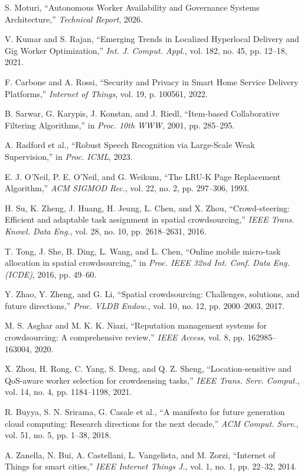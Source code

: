 \documentclass[10pt,twocolumn,a4paper]{article}
\begin{document}
{\noindent [13] S. Moturi, ``Autonomous Worker Availability and Governance Systems Architecture,'' \textit{Technical Report}, 2026.\par
\noindent [14] V. Kumar and S. Rajan, ``Emerging Trends in Localized Hyperlocal Delivery and Gig Worker Optimization,'' \textit{Int. J. Comput. Appl.}, vol. 182, no. 45, pp. 12--18, 2021.\par
\noindent [15] F. Carbone and A. Rossi, ``Security and Privacy in Smart Home Service Delivery Platforms,'' \textit{Internet of Things}, vol. 19, p. 100561, 2022.\par
\noindent [16] B. Sarwar, G. Karypis, J. Konstan, and J. Riedl, ``Item-based Collaborative Filtering Algorithms,'' in \textit{Proc. 10th WWW}, 2001, pp. 285--295.\par
\noindent [17] A. Radford et al., ``Robust Speech Recognition via Large-Scale Weak Supervision,'' in \textit{Proc. ICML}, 2023.\par
\noindent [18] E. J. O'Neil, P. E. O'Neil, and G. Weikum, ``The LRU-K Page Replacement Algorithm,'' \textit{ACM SIGMOD Rec.}, vol. 22, no. 2, pp. 297--306, 1993.\par
\noindent [19] H. Su, K. Zheng, J. Huang, H. Jeung, L. Chen, and X. Zhou, ``Crowd-steering: Efficient and adaptable task assignment in spatial crowdsourcing,'' \textit{IEEE Trans. Knowl. Data Eng.}, vol. 28, no. 10, pp. 2618--2631, 2016.\par
\noindent [20] T. Tong, J. She, B. Ding, L. Wang, and L. Chen, ``Online mobile micro-task allocation in spatial crowdsourcing,'' in \textit{Proc. IEEE 32nd Int. Conf. Data Eng. (ICDE)}, 2016, pp. 49--60.\par
\noindent [21] Y. Zhao, Y. Zheng, and G. Li, ``Spatial crowdsourcing: Challenges, solutions, and future directions,'' \textit{Proc. VLDB Endow.}, vol. 10, no. 12, pp. 2000--2003, 2017.\par
\noindent [22] M. S. Asghar and M. K. K. Niazi, ``Reputation management systems for crowdsourcing: A comprehensive review,'' \textit{IEEE Access}, vol. 8, pp. 162985--163004, 2020.\par
\noindent [23] X. Zhou, H. Rong, C. Yang, S. Deng, and Q. Z. Sheng, ``Location-sensitive and QoS-aware worker selection for crowdsensing tasks,'' \textit{IEEE Trans. Serv. Comput.}, vol. 14, no. 4, pp. 1184--1198, 2021.\par
\noindent [24] R. Buyya, S. N. Srirama, G. Casale et al., ``A manifesto for future generation cloud computing: Research directions for the next decade,'' \textit{ACM Comput. Surv.}, vol. 51, no. 5, pp. 1--38, 2018.\par
\noindent [25] A. Zanella, N. Bui, A. Castellani, L. Vangelista, and M. Zorzi, ``Internet of Things for smart cities,'' \textit{IEEE Internet Things J.}, vol. 1, no. 1, pp. 22--32, 2014.\par
}
\end{document}
